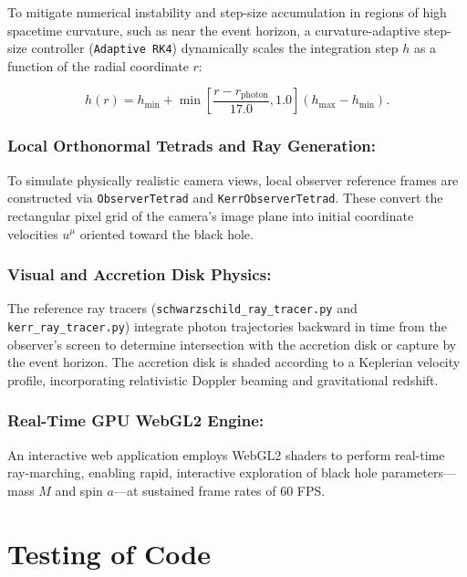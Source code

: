 \documentclass[12pt]{article}
\begin{document}
\begin{itemize}
To mitigate numerical instability and step-size accumulation in regions of high spacetime curvature, such as near the event horizon, a curvature-adaptive step-size controller (\texttt{Adaptive RK4}) dynamically scales the integration step $h$ as a function of the radial coordinate $r$:

\begin{equation}
h(r)
=
h_{\min}
+
\min\left[
\frac{r-r_{\mathrm{photon}}}{17.0},
1.0
\right]
\left(
h_{\max}-h_{\min}
\right).
\end{equation}

\medskip

\subsubsection{\textbf{Local Orthonormal Tetrads and Ray Generation:}}
To simulate physically realistic camera views, local observer reference frames are constructed via \texttt{ObserverTetrad} and \texttt{KerrObserverTetrad}. These convert the rectangular pixel grid of the camera's image plane into initial coordinate velocities $u^\mu$ oriented toward the black hole.

\medskip

\subsubsection{\textbf{Visual and Accretion Disk Physics:}}
The reference ray tracers (\small\texttt{schwarzschild\_ray\_tracer.py} and\\ \texttt{kerr\_ray\_tracer.py}) integrate photon trajectories backward in time from the  
observer's screen to determine intersection with the accretion disk or capture by the event horizon. The accretion disk is shaded according to a Keplerian velocity  
profile, incorporating relativistic Doppler beaming and gravitational redshift.
\medskip

\subsubsection{\textbf{Real-Time GPU WebGL2 Engine:}}
An interactive web application employs WebGL2 shaders to perform real-time ray-marching, enabling rapid, interactive exploration of black hole parameters---mass $M$ and spin $a$---at sustained frame rates of 60 FPS.


\section{Testing of Code}


\end{itemize}
\end{document}
